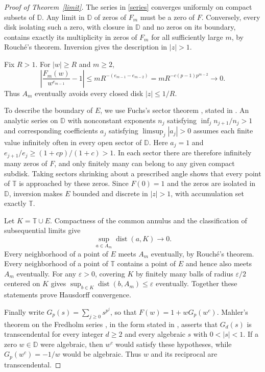 \documentclass[11pt]{article}
\newcommand{\D}{\mathbb D}
\newcommand{\T}{\mathbb T}
\begin{document}
\begin{proof}[Proof of Theorem~\ref{limit}]
The series in \eqref{series} converges uniformly on compact subsets of
\(\D\). Any limit in \(\D\) of zeros of \(F_m\) must be a zero of \(F\).
Conversely, every disk isolating such a zero, with closure in \(\D\)
and no zeros on its boundary, contains exactly its multiplicity in
zeros of \(F_m\) for all sufficiently large \(m\), by Rouch\'e's
theorem. Inversion gives the description in \(|z|>1\).

Fix \(R>1\). For \(|w|\ge R\) and \(m\ge2\),
\[
 \left|\frac{F_m(w)}{w^{e_{m-1}}}-1\right|
 \le m R^{-(e_{m-1}-e_{m-2})}
 =mR^{-c(p-1)p^{m-2}}\longrightarrow0 .
\]
Thus \(A_m\) eventually avoids every closed disk \(|z|\le1/R\).

To describe the boundary of \(E\), we use Fuchs's sector theorem
\cite{fuchs}, stated in \cite[p.~515]{sons}. An analytic series on
\(\D\) with nonconstant exponents \(n_j\) satisfying
\(\inf_j n_{j+1}/n_j>1\) and corresponding coefficients \(a_j\)
satisfying \(\limsup_j|a_j|>0\) assumes each finite value infinitely
often in every open sector of \(\D\). Here \(a_j=1\) and
\(e_{j+1}/e_j\ge(1+cp)/(1+c)>1\). In each sector there are therefore
infinitely many zeros of \(F\), and only finitely many can belong to
any given compact subdisk. Taking sectors shrinking about a
prescribed angle shows that every point of \(\T\) is approached by
these zeros. Since \(F(0)=1\) and the zeros are isolated in \(\D\),
inversion makes \(E\) bounded and discrete in \(|z|>1\), with
accumulation set exactly \(\T\).

Let \(K=\T\cup E\). Compactness of the common annulus and the
classification of subsequential limits give
\[\sup_{a\in A_m}\operatorname{dist}(a,K)\longrightarrow0.\]
Every neighborhood
of a point of \(E\) meets \(A_m\) eventually, by Rouch\'e's theorem.
Every neighborhood of a point of \(\T\) contains a point of \(E\)
and hence also meets \(A_m\) eventually. For any \(\varepsilon>0\),
covering \(K\) by finitely many balls of radius \(\varepsilon/2\)
centered on \(K\) gives
\(\sup_{b\in K}\operatorname{dist}(b,A_m)\le\varepsilon\) eventually.
Together these statements prove Hausdorff convergence.

Finally write \(G_p(s)=\sum_{j\ge0}s^{p^j}\), so that
\(F(w)=1+wG_p(w^c)\). Mahler's theorem on the Fredholm series
\cite{mahler}, in the form stated in \cite[p.~269]{becker}, asserts
that \(G_d(s)\) is transcendental for every integer \(d\ge2\) and
every algebraic \(s\) with \(0<|s|<1\). If a zero \(w\in\D\) were
algebraic, then \(w^c\) would satisfy these hypotheses, while
\(G_p(w^c)=-1/w\) would be algebraic. Thus \(w\) and its reciprocal
are transcendental.
\end{proof}
\end{document}
